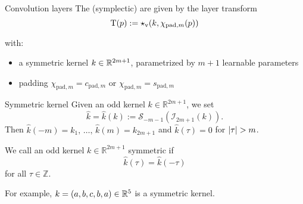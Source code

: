 \begin{frame}[c]{Convolution layers}
  The (symplectic)  are given by the layer transform
  \begin{equation*}
    \mathrm{T}(p) := \star_{\text{v}}(k,\chi_{\text{pad},m}(p))
  \end{equation*}

  with:
  \begin{itemize}
    \item a symmetric kernel $k \in \mathbb{R}^{2m+1}$, 
    parametrized by $m+1$ learnable parameters
    \item padding
    $\chi_{\text{pad},m} = c_{\text{pad},m}$ or $\chi_{\text{pad},m} = s_{\text{pad},m}$
  \end{itemize}
\end{frame}

\begin{frame}{Symmetric kernel}
  Given an odd kernel $k \in \mathbb{R}^{2m+1}$, we set
  \begin{equation*}
    \hat{k} = \hat{k}(k) := \mathcal{S}_{-m-1}(\mathcal{I}_{2m+1}(k))
    .
  \end{equation*}
  Then $\hat{k}(-m) = k_1, \, \dots,\, \hat{k}(m) = k_{2m+1}$ and
  $\hat{k}(\tau)=0$ for $\left|{\tau}\right| > m$.
  \begin{definition}
    We call an odd kernel $k \in \mathbb{R}^{2m+1}$ symmetric if
    \begin{equation*}
      \hat{k}(\tau) = \hat{k}(-\tau)
    \end{equation*}
    for all $\tau \in \mathbb{Z}$.
  \end{definition}

  For example, $k = (a,b,c,b,a) \in \mathbb{R}^5$ is a symmetric kernel.
\end{frame}

